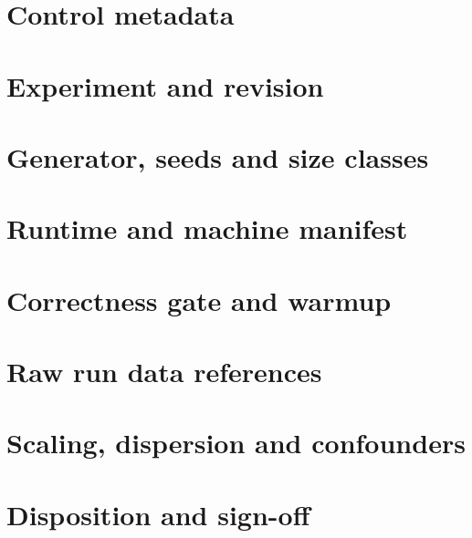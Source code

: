 \documentclass[11pt,letterpaper]{article}
\begin{document}
\makedoctitle\makedocsummary
\section{Control metadata}
\section{Experiment and revision}
\section{Generator, seeds and size classes}
\section{Runtime and machine manifest}
\section{Correctness gate and warmup}
\section{Raw run data references}
\section{Scaling, dispersion and confounders}
\section{Disposition and sign-off}
\end{document}
